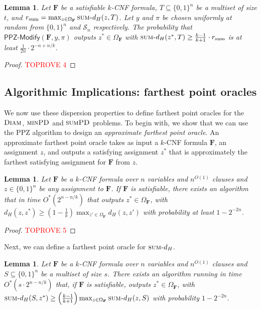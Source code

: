 \documentclass[11pt, letterpaper]{article}
\newtheorem{lemma}[theorem]{Lemma}
\theoremstyle{definition}
\newcommand{\Q}[1]{\{0,1\}^{#1}}
\newcommand{\f}{\mathbf{F}}
\newcommand{\Om}{\Omega_{\f}}
\newcommand{\PD}{\textsc{minPD}}
\newcommand{\SPD}{\textsc{sumPD}}
\newcommand{\sumd}{\textsc{sum-}d_H}
\newcommand{\D}{\textsc{Diam}}
\newcommand{\PPZMod}{\textsf{PPZ-Modify}}
\begin{document}
\begin{lemma}\label{lem:anchor:sum}
    Let $\f$ be a satisfiable $k$-CNF formula, $T \subseteq \{0,1\}^n$ be a multiset of size $t$, and $r_{\text{sum}}= \max_{z \in \Om}\sumd (z,T)$. Let $y$ and $\pi$ be chosen uniformly at random from $\{0,1\}^n$ and $\mathcal{S}_n$ respectively. The probability that $\PPZMod(\f, y, \pi)$ outputs $z^* \in \Om$ with $\sumd(z^*,T) \geq \frac{k-1}{k+1} \cdot r_{\text{sum}}$ is at least $ \frac{1}{2n} \cdot 2^{-n+n/k}$. 
\end{lemma}
\begin{proof}\textcolor{red}{TOPROVE 4}\end{proof}
\noindent

\subsection{Algorithmic Implications: farthest point oracles} \label{sec:alg}

We now use these dispersion properties to define farthest point oracles for the $\D$, $\PD$ and $\SPD$ problems. To begin with, we show that we can use the PPZ algorithm to design an \emph{approximate farthest point oracle}. An approximate farthest point oracle takes as input a $k$-CNF formula $\f$, an assignment $z$, and outputs a satisfying assignment $z^*$ that is approximately the farthest satisfying assignment for $\f$ from $z$. 
\begin{lemma} \label{lem:PPZFarthest}
     Let $\f$ be a $k$-CNF formula over $n$ variables and $n^{O(1)}$ clauses and $z \in \Q{n}$ be any assignment to $\f$. If $\f$ is satisfiable, there exists an algorithm that in time $O^*(2^{n-n/k})$ that outputs $z^* \in \Om$, with $d_H(z,z^*) \geq \left(1-\frac{1}{k}\right) \max_{z' \in \Om} d_H(z, z')$ with probability at least $1-2^{-2n}$.
 \end{lemma}
 \begin{proof}\textcolor{red}{TOPROVE 5}\end{proof}
 
Next, we can define a farthest point oracle for $\sumd$. 
 \begin{lemma} \label{lem:PPZFarthestSum}
     Let $\f$ be a $k$-CNF formula over $n$ variables and $n^{O(1)}$ clauses and $S\subseteq \{0,1\}^n$ be a multiset of size $s$. There exists an algorithm running in time $O^*(s \cdot 2^{n-n/k})$ that, if $\f$ is satisfiable, outputs $z^* \in \Om$, with $\sumd(S,z^*) \geq \left(\frac{k-1}{k+1}\right) \max_{z \in \Om} \sumd(z, S)$ with probability $1-2^{-2n}$.
 \end{lemma}
\end{document}
